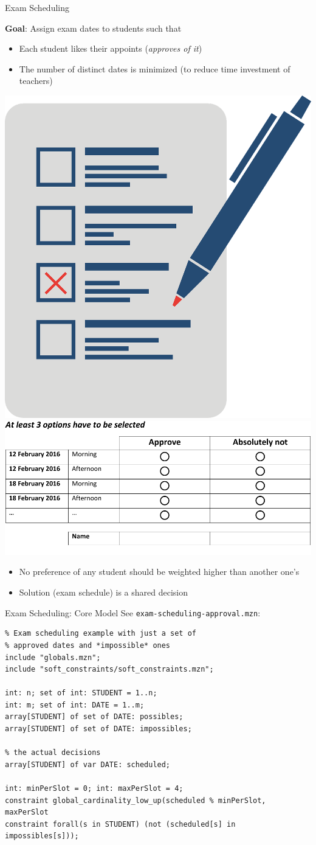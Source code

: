 

\begin{frame}[fragile]{Exam Scheduling}

\textbf{Goal}: Assign exam dates to students such that 
\begin{itemize}
\item Each student likes their appoints (\emph{approves of it})
\item The number of distinct dates is minimized (to reduce time investment of teachers)
\end{itemize}

\begin{center}
\includegraphics[width=.15\textwidth]{img/voting.png}
\hspace*{4ex}
\includegraphics[width=.5\textwidth]{img/Voting.pdf}
\end{center}

\begin{itemize}
\item No preference of any student should be weighted higher than another one's
\item Solution (exam schedule) is a shared decision

\end{itemize}
\end{frame}

\begin{frame}[fragile]{Exam Scheduling: Core Model}
See \texttt{exam-scheduling-approval.mzn}:
\begin{lstlisting}
% Exam scheduling example with just a set of 
% approved dates and *impossible* ones
include "globals.mzn";
include "soft_constraints/soft_constraints.mzn";

int: n; set of int: STUDENT = 1..n; 
int: m; set of int: DATE = 1..m;
array[STUDENT] of set of DATE: possibles;
array[STUDENT] of set of DATE: impossibles;

% the actual decisions
array[STUDENT] of var DATE: scheduled;

int: minPerSlot = 0; int: maxPerSlot = 4;
constraint global_cardinality_low_up(scheduled % minPerSlot, maxPerSlot
constraint forall(s in STUDENT) (not (scheduled[s] in impossibles[s])); 
 
\end{lstlisting}
\end{frame}

